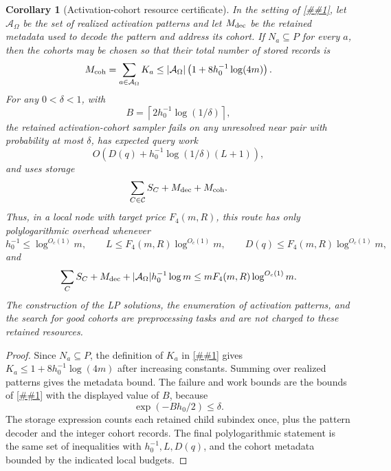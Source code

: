 \documentclass[10pt]{article}
\newcommand{\cref}[1]{\ref{##1}}
\newtheorem{corollary}[theorem]{Corollary}
\theoremstyle{definition}
\begin{document}
\begin{corollary}[Activation-cohort resource certificate]
   \label{cor:activation-cohort-resources}
   In the setting of \cref{lem:activation-cohort-sampled-compiler}, let
   \(\mathcal A_\Omega\) be the set of realized activation patterns and let
   \(M_{\rm dec}\) be the retained metadata used to decode the pattern and
   address its cohort.  If \(N_a\subseteq P\) for every \(a\), then the cohorts
   may be chosen so that their total number of stored records is
   \[
      M_{\rm coh}
      =
      \sum_{a\in\mathcal A_\Omega}K_a
      \le
      |\mathcal A_\Omega|
      \left(1+8h_0^{-1}\log(4m)\right).
   \]
   For any \(0<\delta<1\), with
   \[
      B=\left\lceil 2h_0^{-1}\log(1/\delta)\right\rceil ,
   \]
   the retained activation-cohort sampler fails on any unresolved near pair
   with probability at most \(\delta\), has expected query work
   \[
      O\!\left(D(q)+h_0^{-1}\log(1/\delta)(L+1)\right),
   \]
   and uses storage
   \[
      \sum_{C\in\mathcal C}S_C+M_{\rm dec}+M_{\rm coh}.
   \]
   Thus, in a local node with target price \(F_4(m,R)\), this route has only
   polylogarithmic overhead whenever
   \[
      h_0^{-1}\le \log^{O_c(1)}m,\qquad
      L\le F_4(m,R)\log^{O_c(1)}m,\qquad
      D(q)\le F_4(m,R)\log^{O_c(1)}m,
   \]
   and
   \[
      \sum_CS_C+M_{\rm dec}
      +|\mathcal A_\Omega|h_0^{-1}\log m
      \le
      mF_4(m,R)\log^{O_c(1)}m .
   \]
   The construction of the LP solutions, the enumeration of activation
   patterns, and the search for good cohorts are preprocessing tasks and are
   not charged to these retained resources.
\end{corollary}

\begin{proof}
   Since \(N_a\subseteq P\), the definition of \(K_a\) in
   \cref{lem:activation-cohort-sampled-compiler} gives
   \(K_a\le1+8h_0^{-1}\log(4m)\) after increasing constants.  Summing over
   realized patterns gives the metadata bound.  The failure and work bounds
   are the bounds of \cref{lem:activation-cohort-sampled-compiler} with the
   displayed value of \(B\), because
   \[
      \exp(-Bh_0/2)\le\delta .
   \]
   The storage expression counts each retained child subindex once, plus the
   pattern decoder and the integer cohort records.  The final polylogarithmic
   statement is the same set of inequalities with
   \(h_0^{-1},L,D(q)\), and the cohort metadata bounded by the indicated
   local budgets.
\end{proof}
\end{document}
